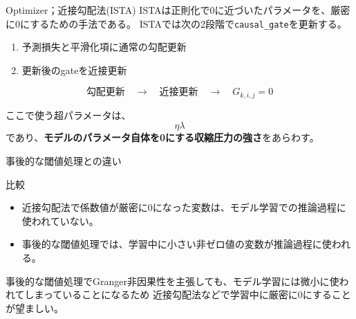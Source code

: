 \documentclass[dvipdfmx,11pt]{beamer}
\begin{document}
\begin{frame}{Optimizer；近接勾配法(ISTA)}
ISTAは正則化で0に近づいたパラメータを、厳密に0にするための手法である。
ISTAでは次の2段階で\texttt{causal\_gate}を更新する。
\begin{center}
  \begin{enumerate}
    \item 予測損失と平滑化項に通常の勾配更新
    \item 更新後のgateを近接更新
  \end{enumerate}
\end{center}
 
  \[
    \text{勾配更新}
    \quad \longrightarrow \quad
    \text{近接更新}
    \quad \longrightarrow \quad
    G_{k,i,j}=0
  \]

  \vspace{0.6em}
  ここで使う超パラメータは、
  \[
    \eta \lambda
  \]
  であり、\textbf{モデルのパラメータ自体を0にする収縮圧力の強さ}をあらわす。

\end{frame}

\begin{frame}{事後的な閾値処理との違い}

  \vspace{0.55em}
  \begin{block}{比較}
    \begin{itemize}
      \item 近接勾配法で係数値が厳密に0になった変数は、モデル学習での推論過程に使われていない。
      \item 事後的な閾値処理では、学習中に小さい非ゼロ値の変数が推論過程に使われる。
    \end{itemize}
  \end{block}
  \vspace{1.5em}
   事後的な閾値処理でGranger非因果性を主張しても、モデル学習には微小に使われてしまっていることになるため
   近接勾配法などで学習中に厳密に0にすることが望ましい。
    
\end{frame}
\end{document}
